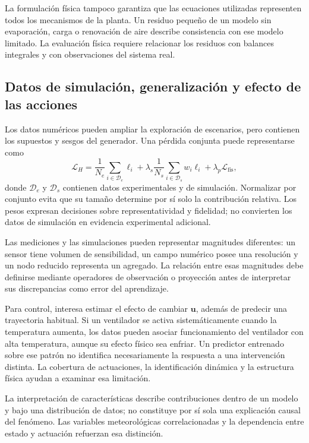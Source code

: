 La formulación física tampoco garantiza que las ecuaciones utilizadas representen todos los mecanismos de la planta. Un residuo pequeño de un modelo sin evaporación, carga o renovación de aire describe consistencia con ese modelo limitado. La evaluación física requiere relacionar los residuos con balances integrales y con observaciones del sistema real.

\subsection{Datos de simulación, generalización y efecto de las acciones}

Los datos numéricos pueden ampliar la exploración de escenarios, pero contienen los supuestos y sesgos del generador. Una pérdida conjunta puede representarse como
\begin{equation}
\mathcal L_H=
\frac{1}{N_e}\sum_{i\in\mathcal D_e}\ell_i
+\lambda_s\frac{1}{N_s}\sum_{i\in\mathcal D_s}w_i\ell_i
+\lambda_p\mathcal L_{\mathrm{fis}},
\label{eq:perdida_datos_hibridos}
\end{equation}
donde $\mathcal D_e$ y $\mathcal D_s$ contienen datos experimentales y de simulación. Normalizar por conjunto evita que su tamaño determine por sí solo la contribución relativa. Los pesos expresan decisiones sobre representatividad y fidelidad; no convierten los datos de simulación en evidencia experimental adicional.

Las mediciones y las simulaciones pueden representar magnitudes diferentes: un sensor tiene volumen de sensibilidad, un campo numérico posee una resolución y un nodo reducido representa un agregado. La relación entre esas magnitudes debe definirse mediante operadores de observación o proyección antes de interpretar sus discrepancias como error del aprendizaje.

Para control, interesa estimar el efecto de cambiar $\mathbf u$, además de predecir una trayectoria habitual. Si un ventilador se activa sistemáticamente cuando la temperatura aumenta, los datos pueden asociar funcionamiento del ventilador con alta temperatura, aunque su efecto físico sea enfriar. Un predictor entrenado sobre ese patrón no identifica necesariamente la respuesta a una intervención distinta. La cobertura de actuaciones, la identificación dinámica y la estructura física ayudan a examinar esa limitación.

La interpretación de características describe contribuciones dentro de un modelo y bajo una distribución de datos; no constituye por sí sola una explicación causal del fenómeno. Las variables meteorológicas correlacionadas y la dependencia entre estado y actuación refuerzan esa distinción.

